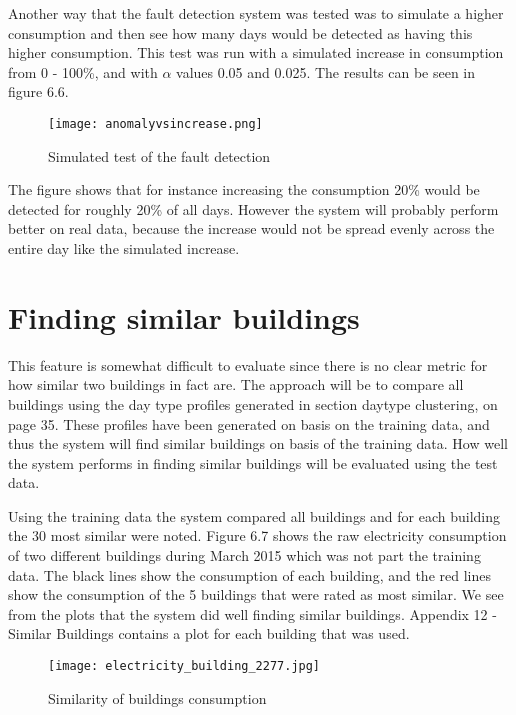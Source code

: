Another way that the fault detection system was tested was to simulate a higher consumption and then see how many days would be detected as having this higher consumption. This test was run with a simulated increase in consumption from 0 - 100\%, and with $\alpha$ values 0.05 and 0.025. The results can be seen in figure 6.6.
\begin{figure}
\begin{center}
\texttt{[image: anomalyvsincrease.png]}
\end{center}
\caption{Simulated test of the fault detection}
\end{figure}
The figure shows that for instance increasing the consumption 20\% would be detected for roughly 20\% of all days. However the system will probably perform better on real data, because the increase would not be spread evenly across the entire day like the simulated increase.
\section*{Finding similar buildings}
This feature is somewhat difficult to evaluate since there is no clear metric for how similar two buildings in fact are. The approach will be to compare all buildings using the day type profiles generated in section daytype clustering, on page 35. These profiles have been generated on basis on the training data, and thus the system will find similar buildings on basis of the training data. How well the system performs in finding similar buildings will be evaluated using the test data.

Using the training data the system compared all buildings and for each building the 30 most similar were noted. Figure 6.7 shows the raw electricity consumption of two different buildings during March 2015 which was not part the training data. The black lines show the consumption of each building, and the red lines show the consumption of the 5 buildings that were rated as most similar. We see from the plots that the system did well finding similar buildings. Appendix 12 -Similar Buildings contains a plot for each building that was used.
\begin{figure}
\begin{center}
\texttt{[image: electricity\_building\_2277.jpg]}
\end{center}
\caption{Similarity of buildings consumption}
\end{figure}

